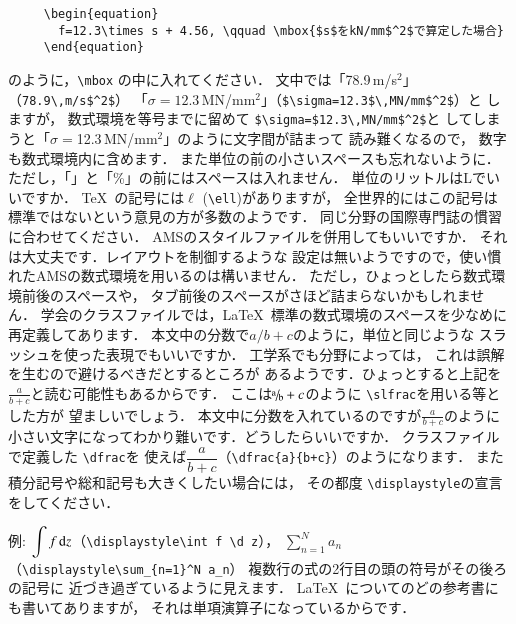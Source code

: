 \documentclass[onecolumn]{jsce}  %
\begin{document}
\begin{Enumerate}
\renewcommand{\baselinestretch}{0.75}\small\normalsize
\begin{verbatim}
     \begin{equation}
       f=12.3\times s + 4.56, \qquad \mbox{$s$をkN/mm$^2$で算定した場合}
     \end{equation}
\end{verbatim}
\renewcommand{\baselinestretch}{1}\small\normalsize
のように，\verb+\mbox+ の中に入れてください．
文中では「78.9\,m/s$^2$」（\verb+78.9\,m/s$^2$+）
「$\sigma=12.3$\,MN/mm$^2$」（\verb+$\sigma=12.3$\,MN/mm$^2$+）と
しますが，
数式環境を等号までに留めて \verb+$\sigma=$12.3\,MN/mm$^2$+と
してしまうと「$\sigma=$12.3\,MN/mm$^2$」のように文字間が詰まって
読み難くなるので，
数字も数式環境内に含めます．
また単位の前の小さいスペースも忘れないように．
ただし，「\degC」と「\%」の前にはスペースは入れません．
%
\Qitem 単位のリットルはLでいいですか．
\Aitem \TeX\ の記号には$\ell$ (\verb+\ell+)がありますが，
全世界的にはこの記号は
標準ではないという意見の方が多数のようです．
同じ分野の国際専門誌の慣習に合わせてください．
%
\Qitem AMSのスタイルファイルを併用してもいいですか．
\Aitem それは大丈夫です．レイアウトを制御するような
設定は無いようですので，使い慣れたAMSの数式環境を用いるのは構いません．
ただし，ひょっとしたら数式環境前後のスペースや，
タブ前後のスペースがさほど詰まらないかもしれません．
学会のクラスファイルでは，\LaTeX\ 標準の数式環境のスペースを少なめに
再定義してあります．
%
\Qitem 本文中の分数で$a/b+c$のように，単位と同じような
スラッシュを使った表現でもいいですか．
\Aitem 工学系でも分野によっては，
これは誤解を生むので避けるべきだとするところが
あるようです．ひょっとすると上記を$\frac{a}{b+c}$と読む可能性もあるからです．
ここは$\slfrac{a}{b}+c$のように \verb+\slfrac+を用いる等とした方が
望ましいでしょう．
%
\Qitem 本文中に分数を入れているのですが$\frac{a}{b+c}$のように
小さい文字になってわかり難いです．どうしたらいいですか．
\Aitem クラスファイルで定義した \verb+\dfrac+を
使えば$\dfrac{a}{b+c}$（\verb|\dfrac{a}{b+c}|）のようになります．
また積分記号や総和記号も大きくしたい場合には，
その都度 \verb+\displaystyle+の宣言をしてください．

例: $\displaystyle\int f \,\mbox{d} z$（\verb+\displaystyle\int f \d z+），
$\displaystyle\sum_{n=1}^N a_n$（\verb+\displaystyle\sum_{n=1}^N a_n+）
%
\Qitem 複数行の式の2行目の頭の符号がその後ろの記号に
近づき過ぎているように見えます．
\Aitem \LaTeX\ についてのどの参考書にも書いてありますが，
それは単項演算子になっているからです．


\end{Enumerate}
\end{document}
